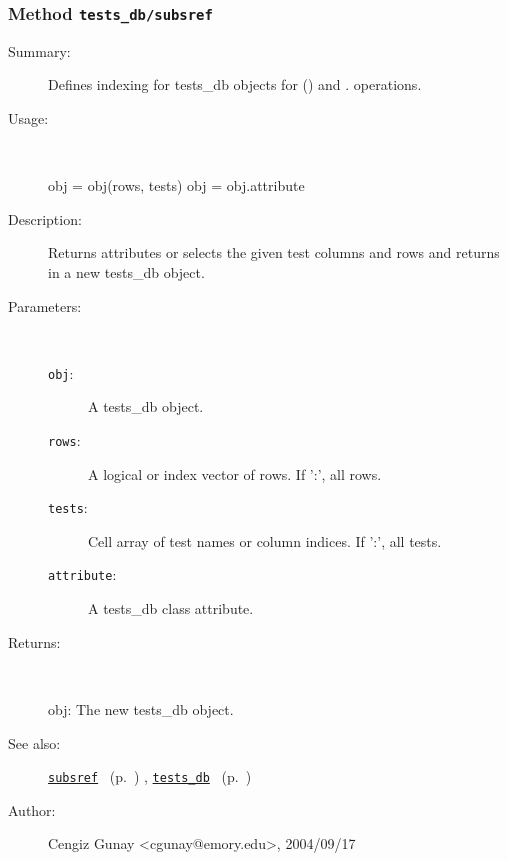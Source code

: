 \subsubsection[Method \texttt{subsref}]{Method \texttt{tests\_db/subsref}}%
%
\label{ref_tests_db__subsref}%
\hypertarget{ref_tests_db__subsref}{}%
\begin{description}
\item[Summary:]Defines indexing for tests\_db objects for () and . operations. 
%
\item[Usage:]~%
\begin{lyxcode}%
obj = obj(rows, tests)
 obj = obj.attribute
%
\end{lyxcode}%
%
\item[Description:]%
Returns attributes or selects the given test columns and rows
 and returns in a new tests\_db object.
\item[Parameters:]~
\begin{description}%
\item[\texttt{obj}:]
 A tests\_db object.
\item[\texttt{rows}:]
 A logical or index vector of rows. If ':', all rows.
\item[\texttt{tests}:]
 Cell array of test names or column indices. If ':', all tests.
\item[\texttt{attribute}:]
 A tests\_db class attribute.
\end{description}%
%
\item[Returns:]~

	obj: The new tests\_db object.
%
%
\item[See also:]%
\hyperlink{ref_subsref}{\texttt{subsref}}%
\ (p.~\pageref{ref_subsref})%
%
, \hyperlink{ref_tests_db}{\texttt{tests\_db}}%
\ (p.~\pageref{ref_tests_db})%
%
%
\item[Author:]%
Cengiz Gunay <cgunay@emory.edu>, 2004/09/17%
\end{description}
\methodline%
